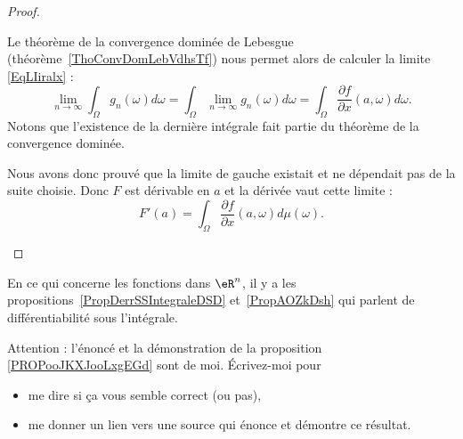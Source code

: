 \begin{proof}
\begin{subproof}
		Le théorème de la convergence dominée de Lebesgue (théorème~\ref{ThoConvDomLebVdhsTf}) nous permet alors de calculer la limite \eqref{EqLIiralx} :
		\begin{equation}
			\lim_{n\to \infty} \int_{\Omega}g_n(\omega)d\omega=\int_{\Omega}\lim_{n\to \infty} g_n(\omega)d\omega=\int_{\Omega}\frac{ \partial f }{ \partial x }(a,\omega)d\omega.
		\end{equation}
		Notons que l'existence de la dernière intégrale fait partie du théorème de la convergence dominée.

		Nous avons donc prouvé que la limite de gauche existait et ne dépendait pas de la suite choisie. Donc \( F\) est dérivable en \( a\) et la dérivée vaut cette limite :
		\begin{equation}
			F'(a)=\int_{\Omega}\frac{ \partial f }{ \partial x }(a,\omega)d\mu(\omega).
		\end{equation}
	\end{subproof}
\end{proof}

En ce qui concerne les fonctions dans \( \eR^n\), il y a les  propositions~\ref{PropDerrSSIntegraleDSD} et~\ref{PropAOZkDsh} qui parlent de différentiabilité sous l'intégrale.

\begin{probleme}
	Attention : l'énoncé et la démonstration de la proposition \ref{PROPooJKXJooLxgEGd} sont de moi. Écrivez-moi pour
	\begin{itemize}
		\item me dire si ça vous semble correct (ou pas),
		\item me donner un lien vers une source qui énonce et démontre ce résultat.
	\end{itemize}
\end{probleme}


